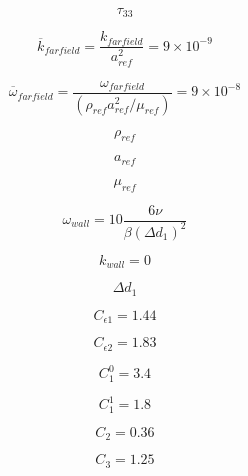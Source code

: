 \begin{equation}
\tau_{33}
\end{equation}

\begin{equation}
\overline k_{farfield} = \frac{k_{farfield}}{a_{ref}^2} = 9 \times 10^{-9}
\end{equation}

\begin{equation}
\overline \omega_{farfield} = \frac{\omega_{farfield}}{(\rho_{ref} a_{ref}^2/ \mu_{ref} )} = 9 \times 10^{-8}
\end{equation}

\begin{equation}
\rho_{ref}
\end{equation}

\begin{equation}
a_{ref}
\end{equation}

\begin{equation}
\mu_{ref}
\end{equation}

\begin{equation}
\omega_{wall} = 10 \frac{6 \nu}{\beta (\Delta d_1)^2}
\end{equation}

\begin{equation}
k_{wall} = 0
\end{equation}

\begin{equation}
\Delta d_1
\end{equation}

\begin{equation}
C_{\epsilon 1} = 1.44
\end{equation}

\begin{equation}
C_{\epsilon 2} = 1.83
\end{equation}

\begin{equation}
C_1^0 = 3.4
\end{equation}

\begin{equation}
C_1^1 = 1.8
\end{equation}

\begin{equation}
C_2 = 0.36
\end{equation}

\begin{equation}
C_3 = 1.25
\end{equation}

